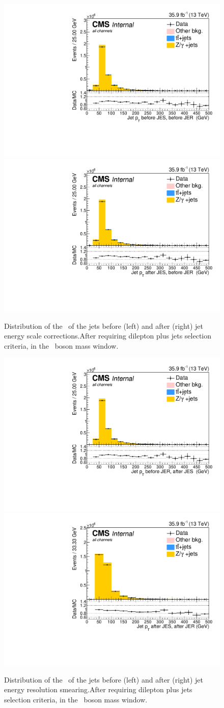 \begin{figure}[htbp]
	\centering
	\includegraphics[width=0.49\linewidth]{5_Eventselection/Figures/Reweighing/2lepcontrol_dilep_JetPt_bfJES_all_Stack}
	\includegraphics[width=0.49\linewidth]{5_Eventselection/Figures/Reweighing/2lepcontrol_dilep_JetPt_afJES_all_Stack}
	\caption{Distribution of the \pt\ of the jets before (left) and after (right) jet energy scale corrections.After requiring dilepton plus jets selection criteria, in the \PZ\ boson mass window.}
	\label{fig:jesSF}
\end{figure}

\begin{figure}[htbp]
	\centering
	\includegraphics[width=0.49\linewidth]{5_Eventselection/Figures/Reweighing/2lepcontrol_dilep_JetPt_bfJER_all_Stack}
	\includegraphics[width=0.49\linewidth]{5_Eventselection/Figures/Reweighing/2lepcontrol_dilep_JetPt_afJER_all_Stack}
	\caption{Distribution of the \pt\ of the jets before (left) and after (right) jet energy resolution smearing.After requiring dilepton plus jets selection criteria, in the \PZ\ boson mass window.}
	\label{fig:jerSF}
\end{figure}



